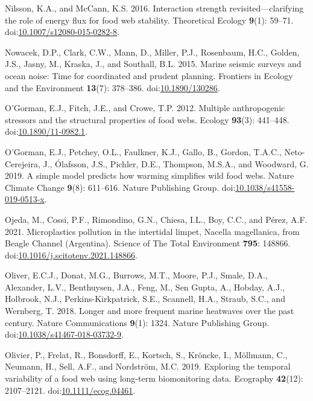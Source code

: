\documentclass[
]{article}
\newlength{\cslhangindent}
\newenvironment{CSLReferences}[2] %
 {\begin{list}{}{%
  \setlength{\itemindent}{0pt}
  \setlength{\leftmargin}{0pt}
  \setlength{\parsep}{0pt}
  \ifodd #1
   \setlength{\leftmargin}{\cslhangindent}
   \setlength{\itemindent}{-1\cslhangindent}
  \fi
  \setlength{\itemsep}{#2\baselineskip}}}
 {\end{list}}
\begin{document}
\begin{CSLReferences}{1}{0}
Nilsson, K.A., and McCann, K.S. 2016. Interaction strength
revisited---clarifying the role of energy flux for food web stability.
Theoretical Ecology \textbf{9}(1): 59--71.
doi:\href{https://doi.org/10.1007/s12080-015-0282-8}{10.1007/s12080-015-0282-8}.

Nowacek, D.P., Clark, C.W., Mann, D., Miller, P.J., Rosenbaum, H.C.,
Golden, J.S., Jasny, M., Kraska, J., and Southall, B.L. 2015. Marine
seismic surveys and ocean noise: Time for coordinated and prudent
planning. Frontiers in Ecology and the Environment \textbf{13}(7):
378--386. doi:\href{https://doi.org/10.1890/130286}{10.1890/130286}.

O'Gorman, E.J., Fitch, J.E., and Crowe, T.P. 2012. Multiple
anthropogenic stressors and the structural properties of food webs.
Ecology \textbf{93}(3): 441--448.
doi:\href{https://doi.org/10.1890/11-0982.1}{10.1890/11-0982.1}.

O'Gorman, E.J., Petchey, O.L., Faulkner, K.J., Gallo, B., Gordon,
T.A.C., Neto-Cerejeira, J., Ólafsson, J.S., Pichler, D.E., Thompson,
M.S.A., and Woodward, G. 2019. A simple model predicts how warming
simplifies wild food webs. Nature Climate Change \textbf{9}(8):
611--616. Nature Publishing Group.
doi:\href{https://doi.org/10.1038/s41558-019-0513-x}{10.1038/s41558-019-0513-x}.

Ojeda, M., Cossi, P.F., Rimondino, G.N., Chiesa, I.L., Boy, C.C., and
Pérez, A.F. 2021. Microplastics pollution in the intertidal limpet,
{Nacella} magellanica, from {Beagle Channel} ({Argentina}). Science of
The Total Environment \textbf{795}: 148866.
doi:\href{https://doi.org/10.1016/j.scitotenv.2021.148866}{10.1016/j.scitotenv.2021.148866}.

Oliver, E.C.J., Donat, M.G., Burrows, M.T., Moore, P.J., Smale, D.A.,
Alexander, L.V., Benthuysen, J.A., Feng, M., Sen Gupta, A., Hobday,
A.J., Holbrook, N.J., Perkins-Kirkpatrick, S.E., Scannell, H.A., Straub,
S.C., and Wernberg, T. 2018. Longer and more frequent marine heatwaves
over the past century. Nature Communications \textbf{9}(1): 1324. Nature
Publishing Group.
doi:\href{https://doi.org/10.1038/s41467-018-03732-9}{10.1038/s41467-018-03732-9}.

Olivier, P., Frelat, R., Bonsdorff, E., Kortsch, S., Kröncke, I.,
Möllmann, C., Neumann, H., Sell, A.F., and Nordström, M.C. 2019.
Exploring the temporal variability of a food web using long-term
biomonitoring data. Ecography \textbf{42}(12): 2107--2121.
doi:\href{https://doi.org/10.1111/ecog.04461}{10.1111/ecog.04461}.


\end{CSLReferences}
\end{document}
